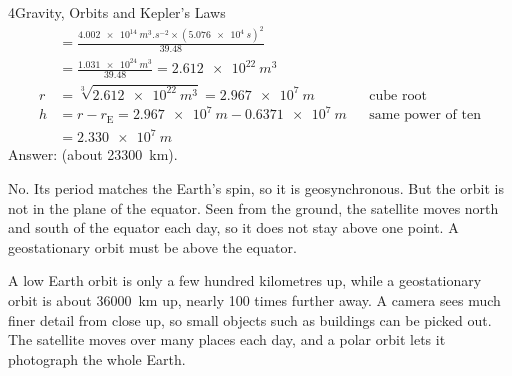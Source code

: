 \begin{chapteranswers}{4}{Gravity, Orbits and Kepler's Laws}
\begin{align*}
          &= \frac{\qty{4.002e14}{m^3.s^{-2}} \times (\qty{5.076e4}{s})^2}{39.48}\\
          &= \frac{\qty{1.031e24}{m^3}}{39.48} = \qty{2.612e22}{m^3}\\
          r &= \sqrt[3]{\qty{2.612e22}{m^3}} = \qty{2.967e7}{m} && \text{cube root}\\
          h &= r - r_\mathrm{E} = \qty{2.967e7}{m} - \qty{0.6371e7}{m} && \text{same power of ten}\\
          &= \qty{2.330e7}{m}
        \end{align*}
        Answer:  (about \qty{23300}{km}).
  \item No. Its period matches the Earth's spin, so it is geosynchronous. But the orbit is not in
        the plane of the equator. Seen from the ground, the satellite moves north and south of the
        equator each day, so it does not stay above one point. A geostationary orbit must be
        above the equator.
  \item A low Earth orbit is only a few hundred kilometres up, while a geostationary orbit is
        about \qty{36000}{km} up, nearly 100 times further away. A camera sees much finer detail
        from close up, so small objects such as buildings can be picked out. The satellite moves
        over many places each day, and a polar orbit lets it photograph the whole Earth.
\end{chapteranswers}

